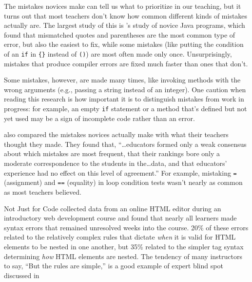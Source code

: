 
The mistakes novices make can tell us what to prioritize in our teaching, but it turns out that most teachers don't know how common different kinds of mistakes actually are. The largest study of this is \cite{Brow2017}'s study of novice Java programs, which found that mismatched quotes and parentheses are the most common type of error, but also the easiest to fix, while some mistakes (like putting the condition of an \texttt{if} in \texttt{\{\}} instead of \texttt{()}) are most often made only once. Unsurprisingly, mistakes that produce compiler errors are fixed much faster than ones that don't.

Some mistakes, however, are made many times, like invoking methods with the wrong arguments (e.g., passing a string instead of an integer). One caution when reading this research is how important it is to distinguish mistakes from work in progress: for example, an empty \texttt{if} statement or a method that's defined but not yet used may be a sign of incomplete code rather than an error.

\cite{Brow2017} also compared the mistakes novices actually make with what their teachers thought they made. They found that, ``{\ldots}educators formed only a weak consensus about which mistakes are most frequent, that their rankings bore only a moderate correspondence to the students in the{\ldots}data, and that educators' experience had no effect on this level of agreement.'' For example, mistaking \texttt{=} (assignment) and \texttt{==} (equality) in loop condition tests wasn't nearly as common as most teachers believed.

\begin{aside}{Not Just for Code}
  \cite{Park2015} collected data from an online HTML editor during an introductory web development course
  and found that nearly all learners made syntax errors that remained unresolved weeks into the course.
  20\% of these errors related to the relatively complex rules
  that dictate \emph{when} it is valid for HTML elements to be nested in one another,
  but 35\% related to the simpler tag syntax determining \emph{how} HTML elements are nested.
  The tendency of many instructors to say,
  ``But the rules are simple,''
  is a good example of expert blind spot discussed in 
\end{aside}


